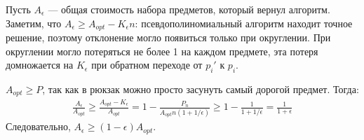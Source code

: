 \documentclass[a4paper,12pt]{article}
\begin{document}
Пусть $A_\epsilon$ — общая стоимость набора предметов, который вернул
алгоритм. Заметим, что $A_\epsilon \geqslant A_{opt} - K_\epsilon n$: псевдополиномиальный алгоритм находит точное решение, поэтому отклонение могло появиться только при округлении. При округлении могло потеряться не более 1 на каждом предмете, эта потеря домножается на $K_\epsilon$ при обратном переходе от $p_i'$ к $p_i$.

$A_{opt} \geqslant P$, так как в рюкзак можно просто засунуть самый дорогой предмет. Тогда:
\begin{gather*}
    \frac{A_\epsilon}{A_{opt}} \geqslant \frac{A_{opt} - K_\epsilon}{A_{opt}} = 1 - \frac{P_n}{A_{opt}n(1 + 1\slash\epsilon)} \geqslant 1 - \frac{1}{1 + 1\slash\epsilon} = \frac{1}{1 + \epsilon}
\end{gather*}
Следовательно, $A_\epsilon \geqslant (1 - \epsilon)A_{opt}$.
\end{document}
